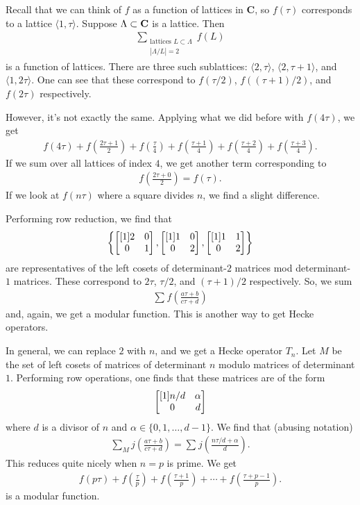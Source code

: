 \documentclass[11pt, oneside,margin=1in]{article}
\begin{document}
Recall that we can think of $f$ as a function of lattices in $\mathbf{C}$, so $f(\tau)$ corresponds to a lattice $\langle 1,\tau\rangle$. Suppose $\Lambda \subset \mathbf C$ is a lattice. Then
\begin{align*}
	\sum_{\substack{\textrm{lattices }L\subset \Lambda\\\left\lvert \Lambda/L \right\rvert =2}}^{}f(L)
\end{align*}
is a function of lattices. There are three such sublattices: $\langle 2,\tau\rangle$, $\langle 2,\tau+1\rangle$, and $\langle 1,2\tau\rangle$. One can see that these correspond to $f(\tau/2)$, $f((\tau + 1)/2)$, and $f(2\tau)$ respectively. 

However, it's not exactly the same. Applying what we did before with $f(4\tau)$, we get
\begin{align*}
	f(4\tau) + f \left(\frac{2\tau + 1}{2} \right) + f\left( \frac{\tau}{4} \right) + f \left( \frac{\tau + 1}{4} \right) + f \left( \frac{\tau+2}{4} \right) + f\left( \frac{\tau+3}{4} \right) .
\end{align*}
If we sum over all lattices of index $4$, we get another term corresponding to
\begin{align*}
	f\left( \frac{2\tau + 0}{2} \right) = f(\tau).
\end{align*}
If we look at $f(n\tau)$ where a square divides $n$, we find a slight difference.

Performing row reduction, we find that 
\begin{align*}
	\left\{ \begin{bmatrix} [1] 2&0\\0&1\end{bmatrix},\begin{bmatrix} [1] 1&0\\0&2\end{bmatrix},\begin{bmatrix} [1] 1&1\\0&2\end{bmatrix} \right\} 
\end{align*}
are representatives of the left cosets of determinant-$2$ matrices mod determinant-$1$ matrices. These correspond to $2\tau$, $\tau/2$, and $(\tau+1)/2$ respectively. So, we sum
\begin{align*}
	\sum_{}^{} f\left( \frac{a\tau + b}{c\tau + d} \right) 
\end{align*}
and, again, we get a modular function. This is another way to get Hecke operators.

In general, we can replace $2$ with $n$, and we get a Hecke operator $T_n$. Let $M$ be the set of left cosets of matrices of determinant $n$ modulo matrices of determinant $1$. Performing row operations, one finds that these matrices are of the form 
\begin{align*}
	\begin{bmatrix} [1] n/d & \alpha\\0&d\end{bmatrix}
\end{align*}
where $d$ is a divisor of $n$ and $\alpha \in \{0,1,\hdots, d-1\}$. We find that (abusing notation)
\begin{align*}
	\sum_{M}^{} j\left( \frac{a\tau + b}{c\tau + d} \right) = \sum_{}^{} j\left( \frac{n\tau/d + \alpha}{d} \right). 
\end{align*}
This reduces quite nicely when $n=p$ is prime. We get 
\begin{align*}
	f(p\tau) + f  \left( \frac{\tau}{p} \right) + f\left( \frac{\tau + 1}{p} \right) + \cdots + f \left( \frac{\tau + p - 1}{p} \right) .
\end{align*}
is a modular function. 
\end{document}

